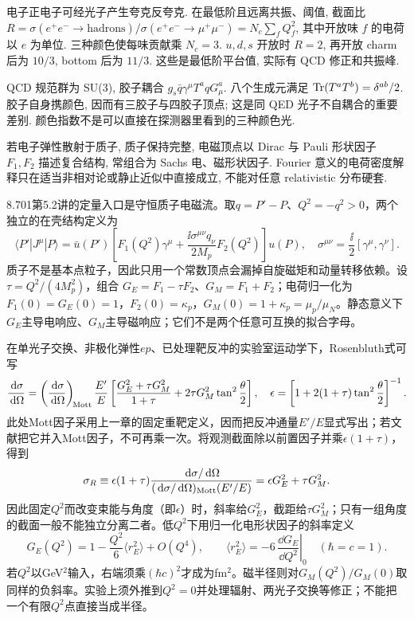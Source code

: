 \label{ch:qcd}
电子正电子可经光子产生夸克反夸克. 在最低阶且远离共振、阈值, 截面比
$R=\sigma(e^+e^-\to\mathrm{hadrons})/\sigma(e^+e^-\to\mu^+\mu^-)=N_c\sum_f Q_f^2$, 其中开放味 $f$ 的电荷以 $e$ 为单位. 三种颜色使每味贡献乘 $N_c=3$. $u,d,s$ 开放时 $R=2$, 再开放 charm 后为 $10/3$, bottom 后为 $11/3$. 这些是最低阶平台值, 实际有 QCD 修正和共振峰.

QCD 规范群为 SU(3), 胶子耦合 $g_s\bar q\gamma^\mu T^aqG_\mu^a$. 八个生成元满足 $\operatorname{Tr}(T^aT^b)=\delta^{ab}/2$. 胶子自身携颜色, 因而有三胶子与四胶子顶点; 这是同 QED 光子不自耦合的重要差别. 颜色指数不是可以直接在探测器里看到的三种颜色光.

若电子弹性散射于质子, 质子保持完整, 电磁顶点以 Dirac 与 Pauli 形状因子 $F_1,F_2$ 描述复合结构, 常组合为 Sachs 电、磁形状因子. Fourier 意义的电荷密度解释只在适当非相对论或静止近似中直接成立, 不能对任意 relativistic 分布硬套.

8.701第5.2讲的定量入口是守恒质子电磁流。取$q=P'-P$、$Q^2=-q^2>0$，两个独立的在壳结构定义为
\begin{equation}
\langle P'|J^\mu|P\rangle
=\bar u(P')\left[F_1(Q^2)\gamma^\mu+
\frac{\ii\sigma^{\mu\nu}q_\nu}{2M_p}F_2(Q^2)\right]u(P),
\quad \sigma^{\mu\nu}=\frac{\ii}{2}[\gamma^\mu,\gamma^\nu].
\end{equation}
质子不是基本点粒子，因此只用一个常数顶点会漏掉自旋磁矩和动量转移依赖。设$\tau=Q^2/(4M_p^2)$，组合
$G_E=F_1-\tau F_2$、$G_M=F_1+F_2$；电荷归一化为$F_1(0)=G_E(0)=1$，$F_2(0)=\kappa_p$，$G_M(0)=1+\kappa_p=\mu_p/\mu_N$。静态意义下$G_E$主导电响应、$G_M$主导磁响应；它们不是两个任意可互换的拟合字母。

在单光子交换、非极化弹性$ep$、已处理靶反冲的实验室运动学下，Rosenbluth式可写
\begin{equation}
\frac{\,\mathrm d\sigma}{\,\mathrm d\Omega}
=\left(\frac{\,\mathrm d\sigma}{\,\mathrm d\Omega}\right)_{\!\rm Mott}
\frac{E'}E\left[
\frac{G_E^2+\tau G_M^2}{1+\tau}
+2\tau G_M^2\tan^2\frac\theta2\right],\quad
\epsilon=\left[1+2(1+\tau)\tan^2\frac\theta2\right]^{-1}.
\end{equation}
此处Mott因子采用上一章的固定重靶定义，因而把反冲通量$E'/E$显式写出；若文献把它并入Mott因子，不可再乘一次。将观测截面除以前置因子并乘$\epsilon(1+\tau)$，得到
\begin{equation}
\sigma_R\equiv\epsilon(1+\tau)
\frac{\,\mathrm d\sigma/\,\mathrm d\Omega}
{(\,\mathrm d\sigma/\,\mathrm d\Omega)_{\rm Mott}(E'/E)}
=\epsilon G_E^2+\tau G_M^2.
\end{equation}
因此固定$Q^2$而改变束能与角度（即$\epsilon$）时，斜率给$G_E^2$，截距给$\tau G_M^2$；只有一组角度的截面一般不能独立分离二者。低$Q^2$下用归一化电形状因子的斜率定义
\begin{equation}
G_E(Q^2)=1-\frac{Q^2}{6}\langle r_E^2\rangle+O(Q^4),
\qquad \langle r_E^2\rangle=-6\,\left.\frac{\dd G_E}{\dd Q^2}\right|_{0}
\quad(\hbar=c=1).
\end{equation}
若$Q^2$以GeV$^2$输入，右端须乘$(\hbar c)^2$才成为fm$^2$。磁半径则对$G_M(Q^2)/G_M(0)$取同样的负斜率。实验上须外推到$Q^2=0$并处理辐射、两光子交换等修正；不能把一个有限$Q^2$点直接当成半径。

